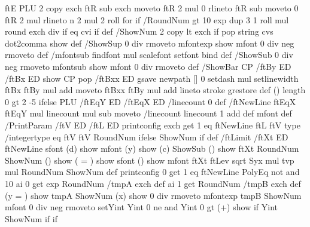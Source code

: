 {{{      ftE PLU
      2 copy exch ftR sub exch moveto ftR 2 mul 0 rlineto
      ftR sub moveto 0 ftR 2 mul rlineto
      n 2 mul 2 roll
    } for
  } if
  \ifPst@ShowEq
  /RoundNum {%
    \psk@decimals{} gt { 10 \psk@decimals\space exp dup 3 1 roll mul round exch div } if
    \psk@decimals{} eq { cvi } if } def
  /ShowNum { %
    \psk@valuewidth{} 2 copy lt { exch } if pop string cvs
    \ifPst@comma\space dot2comma \fi show } def
  /ShowSup { %
    0 \psk@fontscale{} div rmoveto mfontexp show mfont
    0 \psk@fontscale{} div neg rmoveto } def
  /mfontsub { \psk@PSfont\space findfont \psk@fontscale{} mul scalefont setfont } bind def
  /ShowSub { %
    0 \psk@fontscale{} div neg rmoveto mfontsub show mfont
    0 \psk@fontscale{} div rmoveto } def
  /ShowBar { %
    CP /ftBy ED /ftBx ED show CP pop /ftBxx ED
    gsave newpath [] 0 setdash \psk@fontscale{} mul setlinewidth
    ftBx ftBy \psk@fontscale{} mul add moveto
    ftBxx ftBy \psk@fontscale{} mul add lineto stroke grestore } def
  (\psk@EqPos) length 0 gt { \psk@EqPos\space }{ 2 -5 } ifelse PLU /ftEqY ED /ftEqX ED
  /linecount 0 def
  /ftNewLine {%
    ftEqX ftEqY \psk@fontscale{} mul linecount mul sub moveto
    /linecount linecount 1 add def mfont } def
  /PrintParam { %
    /ftV ED /ftL ED
    printconfig exch get 1 eq {%
      ftNewLine ftL
      ftV type /integertype eq { ftV } { ftV RoundNum } ifelse ShowNum
    } if } def
  /ftLimit { %
    /ftXt ED ftNewLine
    sfont (d) show mfont (y) show (c) ShowSub
    (\string{}) show ftXt RoundNum ShowNum (\string{}) show ( = ) show
    sfont (\string{}) show mfont
    ftXt ftLev sqrt Syx mul tvp mul RoundNum ShowNum } def
  printconfig 0 get 1 eq {%
  ftNewLine
  \psk@PowerFit\space PolyEq not and {
  10 ai 0 get exp RoundNum /tmpA exch def
  ai 1 get RoundNum /tmpB exch def
  (y = ) show
  tmpA ShowNum
  (x) show
  0 \psk@fontscale{} div rmoveto
  mfontexp tmpB ShowNum mfont
  0 \psk@fontscale{} div neg rmoveto
  setYint Yint 0 ne and { Yint 0 gt { (+) show } if Yint ShowNum } if } if
}}
